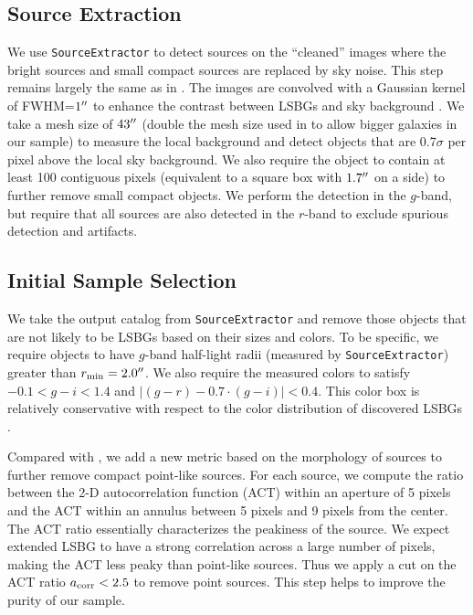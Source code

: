 \documentclass[twocolumn,astrosymb,twocolappendix]{aastex631}
\newcommand{\code}[1]{\texttt{#1}}
\begin{document}
\begin{CJK*}{UTF8}{gbsn}
\subsection{Source Extraction}
We use \code{SourceExtractor} to detect sources on the ``cleaned'' images where the bright sources and small compact sources are replaced by sky noise. This step remains largely the same as in . The images are convolved with a Gaussian kernel of FWHM=$1\mbox{$^{\prime\prime}$}$ to enhance the contrast between LSBGs and sky background \citep[e.g.,][]{Irwin1985,Akhlaghi2015,Greco2018}. We take a mesh size of $43\mbox{$^{\prime\prime}$}$ (double the mesh size used in  to allow bigger galaxies in our sample) to measure the local background and detect objects that are 0.7$\sigma$ per pixel above the local sky background. We also require the object to contain at least 100 contiguous pixels (equivalent to a square box with $1.7\mbox{$^{\prime\prime}$}$ on a side) to further remove small compact objects. We perform the detection in the $g$-band, but require that all sources are also detected in the $r$-band to exclude spurious detection and artifacts.
    
\subsection{Initial Sample Selection} 
We take the output catalog from \code{SourceExtractor} and remove those objects that are not likely to be LSBGs based on their sizes and colors. To be specific, we require objects to have $g$-band half-light radii (measured by \code{SourceExtractor}) greater than $r_{\rm min} = 2.0\mbox{$^{\prime\prime}$}$. We also require the measured colors to satisfy $-0.1 < g-i < 1.4$ and $|(g-r) - 0.7\cdot (g-i)| < 0.4$. This color box is relatively conservative with respect to the color distribution of discovered LSBGs \citep[e.g.,][]{SAGA-I,Greco2018,Zaritsky2019,Tanoglidis2021}. 

Compared with , we add a new metric based on the morphology of sources to further remove compact point-like sources. For each source, we compute the ratio between the 2-D autocorrelation function (ACT) within an aperture of 5 pixels and the ACT within an annulus between 5 pixels and 9 pixels from the center. The ACT ratio essentially characterizes the peakiness of the source. We expect extended LSBG to have a strong correlation across a large number of pixels, making the ACT less peaky than point-like sources. Thus we apply a cut on the ACT ratio $a_{\rm corr} < 2.5$ to remove point sources. This step helps to improve the purity of our sample.


\end{CJK*}
\end{document}
